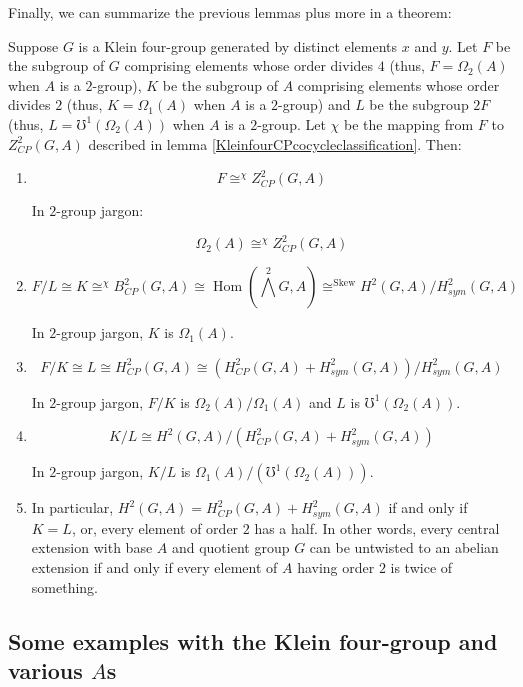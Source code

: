 \documentclass[10pt]{amsart}
\newcommand{\Skew}{\operatorname{Skew}}
\begin{document}
Finally, we can summarize the previous lemmas plus more in a
theorem:

\begin{theorem}\label{Kleinfoursummary}
  Suppose $G$ is a Klein four-group generated by distinct elements $x$
  and $y$. Let $F$ be the subgroup of $G$ comprising elements whose
  order divides $4$ (thus, $F = \Omega_2(A)$ when $A$ is a $2$-group),
  $K$ be the subgroup of $A$ comprising elements whose order divides
  $2$ (thus, $K = \Omega_1(A)$ when $A$ is a $2$-group) and $L$ be the
  subgroup $2F$ (thus, $L = \mho^1(\Omega_2(A))$ when $A$ is a
  $2$-group. Let $\chi$ be the mapping from $F$ to $Z^2_{CP}(G,A)$
  described in lemma \ref{KleinfourCPcocycleclassification}. Then:

  \begin{enumerate}
  \item $$F \cong^{\chi} Z^2_{CP}(G,A)$$

    In $2$-group jargon:

    $$\Omega_2(A) \cong^{\chi} Z^2_{CP}(G,A)$$

  \item $$F/L \cong K \cong^{\chi} B^2_{CP}(G,A) \cong
    \operatorname{Hom}(\bigwedge^2G,A) \cong^{\Skew} H^2(G,A)/H^2_{sym}(G,A)$$

    In $2$-group jargon, $K$ is $\Omega_1(A)$.

  \item $$F/K \cong L \cong H^2_{CP}(G,A) \cong (H^2_{CP}(G,A) + H^2_{sym}(G,A))/H^2_{sym}(G,A)$$

    In $2$-group jargon, $F/K$ is $\Omega_2(A)/\Omega_1(A)$ and $L$ is
    $\mho^1(\Omega_2(A))$.
  \item $$K/L \cong H^2(G,A)/(H^2_{CP}(G,A) + H^2_{sym}(G,A))$$

    In $2$-group jargon, $K/L$ is $\Omega_1(A)/(\mho^1(\Omega_2(A)))$.
  \item In particular, $H^2(G,A) = H^2_{CP}(G,A) + H^2_{sym}(G,A)$ if
    and only if $K = L$, or, every element of order $2$ has a half. In
    other words, every central extension with base $A$ and quotient
    group $G$ can be untwisted to an abelian extension if and only if
    every element of $A$ having order $2$ is twice of something.
  \end{enumerate}
\end{theorem}

\subsection{Some examples with the Klein four-group and various $A$s}
\end{document}
